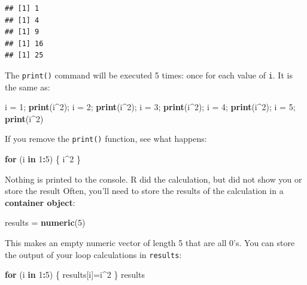 \documentclass[]{book}
\newenvironment{Shaded}{\begin{snugshade}}{\end{snugshade}}
\newcommand{\KeywordTok}[1]{\textcolor[rgb]{0.13,0.29,0.53}{\textbf{#1}}}
\newcommand{\DecValTok}[1]{\textcolor[rgb]{0.00,0.00,0.81}{#1}}
\newcommand{\StringTok}[1]{\textcolor[rgb]{0.31,0.60,0.02}{#1}}
\newcommand{\ControlFlowTok}[1]{\textcolor[rgb]{0.13,0.29,0.53}{\textbf{#1}}}
\newcommand{\OperatorTok}[1]{\textcolor[rgb]{0.81,0.36,0.00}{\textbf{#1}}}
\newcommand{\NormalTok}[1]{#1}
\theoremstyle{definition}
\theoremstyle{definition}
\theoremstyle{definition}
\theoremstyle{remark}
\begin{document}
\begin{verbatim}
## [1] 1
## [1] 4
## [1] 9
## [1] 16
## [1] 25
\end{verbatim}

The \texttt{print()} command will be executed 5 times: once for each
value of \texttt{i}. It is the same as:

\begin{Shaded}
\begin{Highlighting}[]
\NormalTok{i =}\StringTok{ }\DecValTok{1}\NormalTok{; }\KeywordTok{print}\NormalTok{(i}\OperatorTok{^}\DecValTok{2}\NormalTok{); i =}\StringTok{ }\DecValTok{2}\NormalTok{; }\KeywordTok{print}\NormalTok{(i}\OperatorTok{^}\DecValTok{2}\NormalTok{); i =}\StringTok{ }\DecValTok{3}\NormalTok{; }\KeywordTok{print}\NormalTok{(i}\OperatorTok{^}\DecValTok{2}\NormalTok{); i =}\StringTok{ }\DecValTok{4}\NormalTok{; }\KeywordTok{print}\NormalTok{(i}\OperatorTok{^}\DecValTok{2}\NormalTok{); i =}\StringTok{ }\DecValTok{5}\NormalTok{; }\KeywordTok{print}\NormalTok{(i}\OperatorTok{^}\DecValTok{2}\NormalTok{)}
\end{Highlighting}
\end{Shaded}

If you remove the \texttt{print()} function, see what happens:

\begin{Shaded}
\begin{Highlighting}[]
\ControlFlowTok{for}\NormalTok{ (i }\ControlFlowTok{in} \DecValTok{1}\OperatorTok{:}\DecValTok{5}\NormalTok{) \{}
\NormalTok{  i}\OperatorTok{^}\DecValTok{2}
\NormalTok{\}}
\end{Highlighting}
\end{Shaded}

Nothing is printed to the console. R did the calculation, but did not
show you or store the result Often, you'll need to store the results of
the calculation in a \textbf{container object}:

\begin{Shaded}
\begin{Highlighting}[]
\NormalTok{results =}\StringTok{ }\KeywordTok{numeric}\NormalTok{(}\DecValTok{5}\NormalTok{)}
\end{Highlighting}
\end{Shaded}

This makes an empty numeric vector of length 5 that are all 0's. You can
store the output of your loop calculations in \texttt{results}:

\begin{Shaded}
\begin{Highlighting}[]
\ControlFlowTok{for}\NormalTok{ (i }\ControlFlowTok{in} \DecValTok{1}\OperatorTok{:}\DecValTok{5}\NormalTok{) \{}
\NormalTok{  results[i]=i}\OperatorTok{^}\DecValTok{2}
\NormalTok{\}}
\NormalTok{results}
\end{Highlighting}
\end{Shaded}
\end{document}
